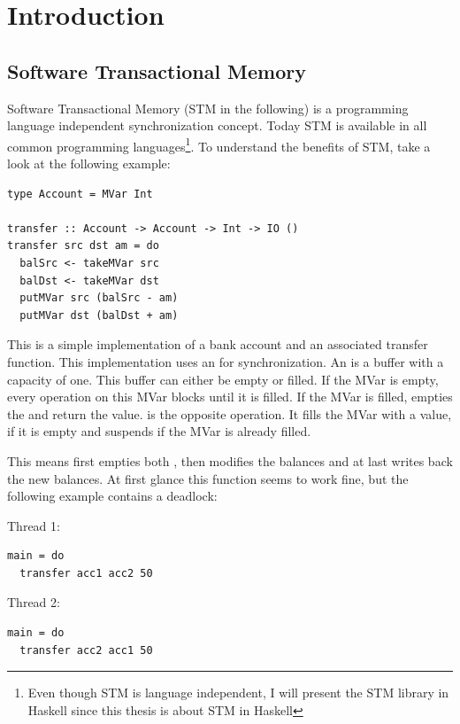
\chapter{Introduction} 

\label{Chapter1} 

\section{Software Transactional Memory}
\label{STMInterface}
Software Transactional Memory (STM in the following) is a programming language independent synchronization concept. Today STM is available 
in all common programming languages\footnote{Even though STM is language independent, I will present the STM library in Haskell since this thesis is
about STM in Haskell}. To understand the benefits of STM, take a look at the following example:
\begin{lstlisting}
type Account = MVar Int

transfer :: Account -> Account -> Int -> IO ()
transfer src dst am = do
  balSrc <- takeMVar src
  balDst <- takeMVar dst
  putMVar src (balSrc - am)
  putMVar dst (balDst + am)
\end{lstlisting}
This is a simple implementation of a bank account and an associated transfer function. This implementation uses an 
for synchronization. An  is a buffer with a capacity of one. This buffer can either be empty or filled. If the MVar is empty,
every  operation on this MVar blocks until it is filled. If the MVar is filled,  empties the 
 and return the value.  is the opposite operation. It fills the MVar with a value, if it is empty and 
suspends if the MVar is already filled.

This means  first empties both , then modifies the balances and at last writes back the new balances.
At first glance this function seems to work fine, but the following example contains a deadlock:
\par\noindent
\begin{minipage}[t]{.45\textwidth}
Thread 1:
\begin{lstlisting}[frame=lrtb]
main = do
  transfer acc1 acc2 50
\end{lstlisting}
\end{minipage}
\hfill
\begin{minipage}[t]{.45\textwidth}
Thread 2:
\begin{lstlisting}[frame=lrtb]
main = do
  transfer acc2 acc1 50
\end{lstlisting}
\end{minipage}

